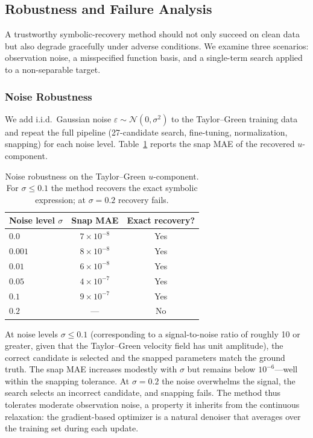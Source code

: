 \subsection{Robustness and Failure Analysis}
\label{sec:robustness}

A trustworthy symbolic-recovery method should not only succeed on clean data
but also degrade gracefully under adverse conditions.  We examine three
scenarios: observation noise, a misspecified function basis, and a
single-term search applied to a non-separable target.

\subsubsection{Noise Robustness}
\label{sec:noise}

We add i.i.d.\ Gaussian noise $\varepsilon \sim \mathcal{N}(0,\sigma^2)$ to
the Taylor--Green training data and repeat the full pipeline (27-candidate
search, fine-tuning, normalization, snapping) for each noise level.
Table~\ref{tab:noise} reports the snap MAE of the recovered $u$-component.

\begin{table}[t]
  \centering
  \caption{Noise robustness on the Taylor--Green $u$-component.  For
    $\sigma \le 0.1$ the method recovers the exact symbolic expression; at
    $\sigma = 0.2$ recovery fails.}
  \label{tab:noise}
  \smallskip
  \begin{tabular}{@{}lcc@{}}
    \toprule
    Noise level $\sigma$ & Snap MAE & Exact recovery? \\
    \midrule
    $0.0$   & $7\!\times\!10^{-8}$ & Yes \\
    $0.001$ & $8\!\times\!10^{-8}$ & Yes \\
    $0.01$  & $6\!\times\!10^{-8}$ & Yes \\
    $0.05$  & $4\!\times\!10^{-7}$ & Yes \\
    $0.1$   & $9\!\times\!10^{-7}$ & Yes \\
    $0.2$   & ---                   & No  \\
    \bottomrule
  \end{tabular}
\end{table}

At noise levels $\sigma \le 0.1$ (corresponding to a signal-to-noise ratio of
roughly 10 or greater, given that the Taylor--Green velocity field has unit
amplitude), the correct candidate is selected and the snapped parameters match
the ground truth.  The snap MAE increases modestly with $\sigma$ but remains
below $10^{-6}$---well within the snapping tolerance.  At $\sigma = 0.2$ the
noise overwhelms the signal, the search selects an incorrect candidate, and
snapping fails.  The method thus tolerates moderate observation noise, a
property it inherits from the continuous relaxation: the gradient-based
optimizer is a natural denoiser that averages over the training set during
each update.

